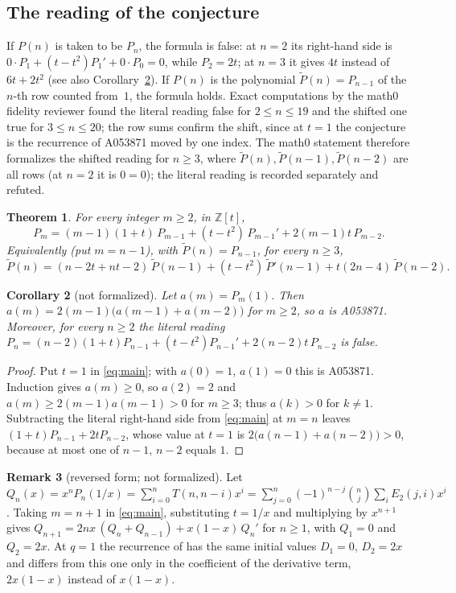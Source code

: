 \documentclass[11pt]{amsart}
\theoremstyle{plain}
\newtheorem{theorem}{Theorem}
\newtheorem{corollary}[theorem]{Corollary}
\theoremstyle{definition}
\newtheorem{remark}[theorem]{Remark}
\newcommand{\Z}{\mathbb{Z}}
\newcommand{\Et}{E_2}
\newcommand{\tP}{\widetilde P}
\begin{document}
\subsection*{The reading of the conjecture}
If $P(n)$ is taken to be $P_n$, the formula is false: at $n=2$ its right-hand side is $0\cdot P_1+(t-t^2)P_1'+0\cdot P_0=0$, while $P_2=2t$; at $n=3$ it gives $4t$ instead of $6t+2t^2$ (see also Corollary~\ref{cor:literal}). If $P(n)$ is the polynomial $\tP(n)=P_{n-1}$ of the $n$-th row counted from~$1$, the formula holds. Exact computations by the math0 fidelity reviewer found the literal reading false for $2\le n\le19$ and the shifted one true for $3\le n\le20$; the row sums confirm the shift, since at $t=1$ the conjecture is the recurrence of A053871 moved by one index. The math0 statement therefore formalizes the shifted reading for $n\ge3$, where $\tP(n),\tP(n-1),\tP(n-2)$ are all rows (at $n=2$ it is $0=0$); the literal reading is recorded separately and refuted.

\begin{theorem}\label{thm:main}
For every integer $m\ge2$, in $\Z[t]$,
\begin{equation}\label{eq:main}
  P_m=(m-1)(1+t)\,P_{m-1}+(t-t^2)\,P_{m-1}'+2(m-1)t\,P_{m-2}.
\end{equation}
Equivalently (put $m=n-1$), with $\tP(n)=P_{n-1}$, for every $n\ge3$,
\[
  \tP(n)=(n-2t+nt-2)\,\tP(n-1)+(t-t^2)\,\tP'(n-1)+t(2n-4)\,\tP(n-2).
\]
\end{theorem}

\begin{corollary}[not formalized]\label{cor:literal}
Let $a(m)=P_m(1)$. Then $a(m)=2(m-1)\bigl(a(m-1)+a(m-2)\bigr)$ for $m\ge2$, so $a$ is A053871. Moreover, for every $n\ge2$ the literal reading $P_n=(n-2)(1+t)P_{n-1}+(t-t^2)P_{n-1}'+2(n-2)t\,P_{n-2}$ is false.
\end{corollary}

\begin{proof}
Put $t=1$ in \eqref{eq:main}; with $a(0)=1$, $a(1)=0$ this is A053871. Induction gives $a(m)\ge0$, so $a(2)=2$ and $a(m)\ge2(m-1)a(m-1)>0$ for $m\ge3$; thus $a(k)>0$ for $k\ne1$. Subtracting the literal right-hand side from \eqref{eq:main} at $m=n$ leaves $(1+t)P_{n-1}+2tP_{n-2}$, whose value at $t=1$ is $2\bigl(a(n-1)+a(n-2)\bigr)>0$, because at most one of $n-1$, $n-2$ equals $1$.
\end{proof}

\begin{remark}[reversed form; not formalized]\label{rem:reversed}
Let $Q_n(x)=x^nP_n(1/x)=\sum_{i=0}^{n}T(n,n-i)x^i=\sum_{j=0}^{n}(-1)^{n-j}\binom nj\sum_i\Et(j,i)x^i$. Taking $m=n+1$ in \eqref{eq:main}, substituting $t=1/x$ and multiplying by $x^{n+1}$ gives
$Q_{n+1}=2nx\,(Q_n+Q_{n-1})+x(1-x)\,Q_n'$ for $n\ge1$, with $Q_1=0$ and $Q_2=2x$. At $q=1$ the recurrence of \cite[Theorem~17]{MY} has the same initial values $D_1=0$, $D_2=2x$ and differs from this one only in the coefficient of the derivative term, $2x(1-x)$ instead of $x(1-x)$.
\end{remark}
\end{document}
